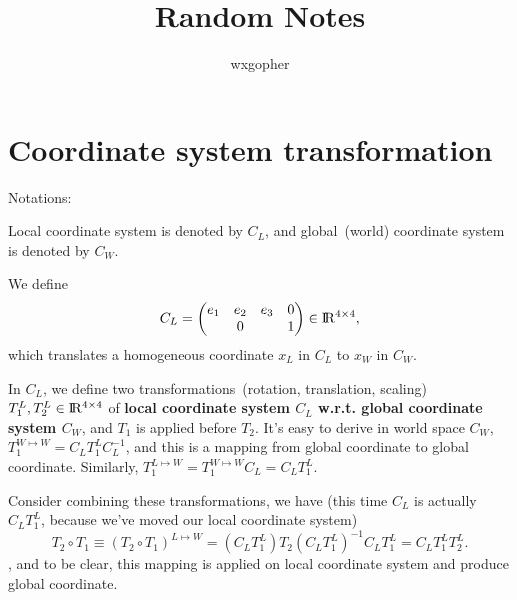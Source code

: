 \documentclass{fancydoc}
\newcommand{\realR}{\rm I\!R}
\begin{document}
\title{Random Notes}
\author{wxgopher}

\maketitle
\tableofcontents
\newpage

\dotfill


\section{Coordinate system transformation}
Notations:

Local coordinate system is denoted by $C_L$, and global~(world) coordinate system is denoted by $C_W$.

We define 
\begin{equation}
C_L = \begin{pmatrix}
e_1 & e_2 & e_3 & 0 \\
    &  0  &    & 1
\end{pmatrix} \in \realR^{4\times 4},
\end{equation}
which translates a homogeneous coordinate $x_L$ in $C_L$ to $x_W$ in $C_W$.

In $C_L$, we define two transformations~(rotation, translation, scaling) $T_1^L,T_2^L\in \realR^{4\times 4}$ of {\bf local coordinate system $C_L$ w.r.t. global coordinate system $C_W$}, and $T_1$ is applied before $T_2$. It's easy to derive in world space $C_W$, $T_1^{W\mapsto W} = C_L T_1^L C_L^{-1}$, and this is a mapping from global coordinate to global coordinate. Similarly, $T_1^{L\mapsto W} = T_1^{W\mapsto W} C_L = C_L T_1^L$.

Consider combining these transformations, we have (this time $C_L$ is actually $C_LT_1^L$, because we've moved our local coordinate system)
\begin{equation}
T_2\circ T_1 \equiv (T_2\circ T_1)^{L\mapsto W} = (C_L T_1^L) T_2 (C_L T_1^L)^{-1} C_L T_1^L = C_L T_1^L T_2^L. 
\end{equation},
and to be clear, this mapping is applied on local coordinate system and produce global coordinate.
\end{document}
